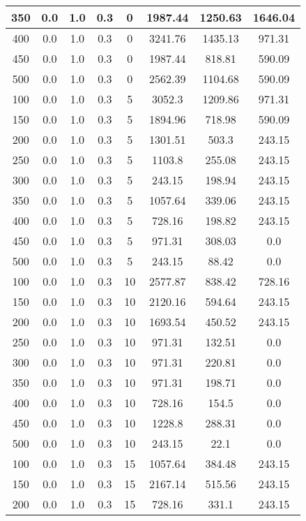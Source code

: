 \documentclass[a4paper, 12pt]{extreport}
\begin{document}
\begin{itemize}
\begin{longtable}{|c|c|c|c|c|c|c|c|}
			350 & 0.0 & 1.0 & 0.3 & 0 & 1987.44 & 1250.63 & 1646.04 \\\hline
			400 & 0.0 & 1.0 & 0.3 & 0 & 3241.76 & 1435.13 & 971.31 \\\hline
			450 & 0.0 & 1.0 & 0.3 & 0 & 1987.44 & 818.81 & 590.09 \\\hline
			500 & 0.0 & 1.0 & 0.3 & 0 & 2562.39 & 1104.68 & 590.09 \\\hline
			100 & 0.0 & 1.0 & 0.3 & 5 & 3052.3 & 1209.86 & 971.31 \\\hline
			150 & 0.0 & 1.0 & 0.3 & 5 & 1894.96 & 718.98 & 590.09 \\\hline
			200 & 0.0 & 1.0 & 0.3 & 5 & 1301.51 & 503.3 & 243.15 \\\hline
			250 & 0.0 & 1.0 & 0.3 & 5 & 1103.8 & 255.08 & 243.15 \\\hline
			300 & 0.0 & 1.0 & 0.3 & 5 & 243.15 & 198.94 & 243.15 \\\hline
			350 & 0.0 & 1.0 & 0.3 & 5 & 1057.64 & 339.06 & 243.15 \\\hline
			400 & 0.0 & 1.0 & 0.3 & 5 & 728.16 & 198.82 & 243.15 \\\hline
			450 & 0.0 & 1.0 & 0.3 & 5 & 971.31 & 308.03 & 0.0 \\\hline
			500 & 0.0 & 1.0 & 0.3 & 5 & 243.15 & 88.42 & 0.0 \\\hline
			100 & 0.0 & 1.0 & 0.3 & 10 & 2577.87 & 838.42 & 728.16 \\\hline
			150 & 0.0 & 1.0 & 0.3 & 10 & 2120.16 & 594.64 & 243.15 \\\hline
			200 & 0.0 & 1.0 & 0.3 & 10 & 1693.54 & 450.52 & 243.15 \\\hline
			250 & 0.0 & 1.0 & 0.3 & 10 & 971.31 & 132.51 & 0.0 \\\hline
			300 & 0.0 & 1.0 & 0.3 & 10 & 971.31 & 220.81 & 0.0 \\\hline
			350 & 0.0 & 1.0 & 0.3 & 10 & 971.31 & 198.71 & 0.0 \\\hline
			400 & 0.0 & 1.0 & 0.3 & 10 & 728.16 & 154.5 & 0.0 \\\hline
			450 & 0.0 & 1.0 & 0.3 & 10 & 1228.8 & 288.31 & 0.0 \\\hline
			500 & 0.0 & 1.0 & 0.3 & 10 & 243.15 & 22.1 & 0.0 \\\hline
			100 & 0.0 & 1.0 & 0.3 & 15 & 1057.64 & 384.48 & 243.15 \\\hline
			150 & 0.0 & 1.0 & 0.3 & 15 & 2167.14 & 515.56 & 243.15 \\\hline
			200 & 0.0 & 1.0 & 0.3 & 15 & 728.16 & 331.1 & 243.15 \\\hline

\end{longtable}
\end{itemize}
\end{document}
